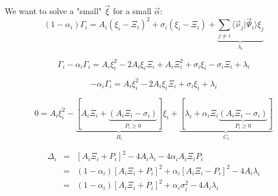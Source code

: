 \documentclass[aps,12pt]{revtex4}
\begin{document}
We want to solve a "small" $\vec{\xi}$ for a small $\vec{\alpha}$:
\begin{equation}
	(1-\alpha_i) \Gamma_i = A_i(\xi_i-\Xi_i)^2 + \sigma_i(\xi_i-\Xi_i) + 
	\underbrace{\sum_{j\not=i} \langle \vec{\nu}_j \vert \vec{\Psi}_i \rangle \xi_j}_{\lambda_i}
\end{equation}

 
\begin{equation}
\Gamma_i - \alpha_i \Gamma_i = A_i \xi_i^2 - 2 A_i \xi_i \Xi_i  + A_i \Xi_i^2 + \sigma_i \xi_i -\sigma_i \Xi_i + \lambda_i
\end{equation}

\begin{equation}
- \alpha_i \Gamma_i = A_i \xi_i^2 - 2 A_i \xi_i \Xi_i  +   \sigma_i \xi_i   + \lambda_i
\end{equation}

\begin{equation}
0 = A_i \xi_i^2 - \underbrace{\left[A_i \Xi_i + \underbrace{(A_i \Xi_i- \sigma_i)}_{P_i\geq0}\right]}_{B_i} \xi_i 
 + \underbrace{\left[\lambda_i + \alpha_i \Xi_i \underbrace{\left(A_i \Xi_i -\sigma_i\right)}_{P_i\geq0}\right]}_{C_i}
\end{equation}

\begin{equation}
\begin{array}{rcl}
\Delta_i & = & \left[A_i\Xi_i+P_i\right]^2 - 4A_i \lambda_i - 4 \alpha_i A_i \Xi_i P_i\\
& = & (1-\alpha_i)\left[A_i\Xi_i+P_i\right]^2 + \alpha_i \left[A_i\Xi_i - P_i\right]^2  - 4A_i \lambda_i\\
& = & (1-\alpha_i)\left[A_i\Xi_i+P_i\right]^2 + \alpha_i \sigma_i^2  - 4A_i \lambda_i
\end{array}
\end{equation}	
\end{document}
